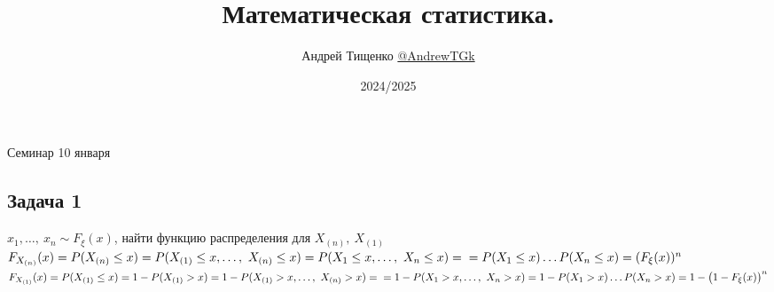 \documentclass[12pt, a4paper]{article}
\title{Математическая статистика.}
\author{Андрей Тищенко \href{https://t.me/AndrewTGk}{@AndrewTGk}}
\date{2024/2025}
\begin{document}
\maketitle
\begin{center}
    Семинар 10 января
\end{center}
\subsection*{Задача 1}
$x_1,\dots,\ x_n\sim F_{\xi}(x)$, найти функцию распределения для $X_{(n)},\ X_{(1)}$\\
$F_{X_{(n)}}(x) = P(X_{(n)} \leq x) = P(X_{(1)} \leq x,\dots,\ X_{(n)} \leq x) = P(X_1 \leq x,\dots,\ X_n \leq x) =\\
=P(X_1\leq x) \dots P(X_n \leq x) =(F_{\xi}(x))^{n}$\\
$F_{X_{(1)}}(x) = P(X_{(1)} \leq x) = 1 - P(X_{(1)} > x) = 1 - P(X_{(1)} > x,\dots,\ X_{(n)} > x) =\\
= 1 - P(X_1 > x,\dots,\ X_n > x) = 1 - P(X_1 > x)\dots P(X_n > x) = 1 - \big(1 - F_{\xi}(x)\big)^n$
\end{document}
